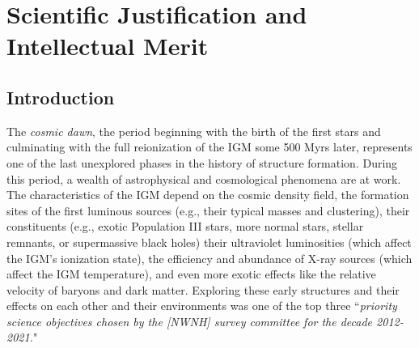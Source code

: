 \documentclass[preprint]{aastex}
\begin{document}
\section{Scientific Justification and Intellectual Merit} %

\subsection{Introduction}    %


The {\it cosmic dawn}, the period beginning with the birth of the first stars and culminating with the full
reionization of the IGM some 500 Myrs later, represents one of the last unexplored phases in 
the history of structure formation. During this period, a wealth of astrophysical and cosmological phenomena are at 
work. The characteristics of the IGM depend on the cosmic density field, the formation sites of the 
first luminous sources (e.g., their typical masses and clustering), their constituents (e.g., exotic Population III 
stars, more normal stars, stellar remnants, or supermassive black holes) their ultraviolet luminosities (which affect 
the IGM's ionization state), the efficiency and abundance of X-ray sources (which affect the IGM temperature), and 
even more exotic effects like the relative velocity of baryons and dark matter.  Exploring these early structures and their 
effects on each other and their environments was one of the top three ``{\it priority science objectives chosen by 
the [NWNH] survey committee for the decade 2012-2021.}"
\end{document}
